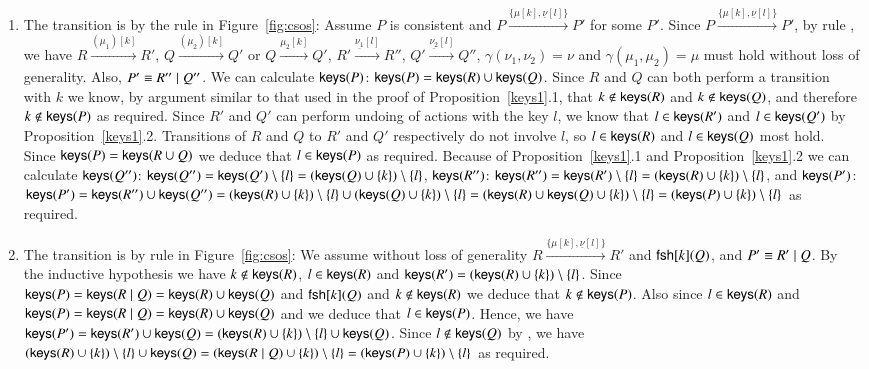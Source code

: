 \begin{subappendices}
\begin{pf}
\begin{enumerate}
\begin{enumerate}
\begin{enumerate}
	\item The transition is by the rule  in Figure~\ref{fig:csos}: Assume $P$ is consistent and $P \xrightarrow{\{\mu[k], \underline{\nu}[l]\}} P'$ for some $P'$. Since $P \xrightarrow{\{\mu[k], \underline{\nu}[l]\}} P'$, by rule , we have $R \xrightarrow{(\mu_1)[k]} R'$, $Q \xrightarrow{(\mu_2)[k]} Q'$ or $Q \xrightarrow{\mu_2[k]} Q'$, $R' \xrightarrow{\underline{\nu_1}[l]} R''$, $Q' \xrightarrow{\underline{\nu_2}[l]} Q''$, $\gamma(\nu_1,\nu_2)=\nu$ and $\gamma(\mu_1,\mu_2)=\mu$ must hold without loss of generality. Also, $P' \equiv R'' \; \vert \; Q''$. We can calculate $\mathsf{keys}(P)$: $\mathsf{keys}(P)=\mathsf{keys}(R) \cup \mathsf{keys}(Q)$. 
Since $R$ and $Q$ can both perform a transition with $k$ we know, by argument similar 
to that used in the proof of Proposition~\ref{keys1}.1,  that $k \notin \mathsf{keys}(R)$ and 
$k \notin \mathsf{keys}(Q)$, and therefore $k \notin \mathsf{keys}(P)$ as required. Since $R'$ and $Q'$ 
can perform undoing of actions with the key $l$, we know that $l \in \mathsf{keys}(R')$ and 
$l \in \mathsf{keys}(Q')$ by Proposition~\ref{keys1}.2. Transitions of $R$ and $Q$ to $R'$ and $Q'$ respectively do not involve $l$, so $l \in \mathsf{keys}(R)$ and $l \in \mathsf{keys}(Q)$ most hold. Since $\mathsf{keys}(P)=\mathsf{keys}(R \cup Q)$ we 
deduce that $l \in \mathsf{keys}(P)$ as required. 
Because of Proposition~\ref{keys1}.1 and Proposition~\ref{keys1}.2 we can calculate 
$\mathsf{keys}(Q'')$: $\mathsf{keys}(Q'')=\mathsf{keys}(Q') \setminus \{l\}=(\mathsf{keys}(Q) \cup \{k\}) \setminus \{l\}$, 
$\mathsf{keys}(R'')$: $\mathsf{keys}(R'')=\mathsf{keys}(R') \setminus \{l\}=(\mathsf{keys}(R) \cup \{k\}) \setminus \{l\}$, 
and $\mathsf{keys}(P')$: $\mathsf{keys}(P')=\mathsf{keys}(R'') \cup \mathsf{keys}(Q'')=
(\mathsf{keys}(R) \cup \{k\}) \setminus \{l\} \cup (\mathsf{keys}(Q) \cup \{k\}) \setminus \{l\}=
(\mathsf{keys}(R) \cup \mathsf{keys}(Q) \cup \{k\}) \setminus \{l\}=(\mathsf{keys}(P) \cup \{k\})\setminus\{l\}$ 
as required.

\item The transition is by  rule in Figure~\ref{fig:csos}: 
We assume without loss of generality $R \xrightarrow{\{\mu[k], \underline{\nu}[l]\}} R'$ 
and $\mathsf{fsh}[k](Q)$, and $P'\equiv R'\; \vert \; Q$. By the inductive hypothesis we have 
$k \notin \mathsf{keys}(R)$, $l \in \mathsf{keys}(R)$ and $\mathsf{keys}(R')=(\mathsf{keys}(R) \cup \{k\})\setminus\{l\}$. 
Since $\mathsf{keys}(P)=\mathsf{keys}(R \; \vert \; Q)=\mathsf{keys}(R) \cup \mathsf{keys}(Q)$ and $\mathsf{fsh}[k](Q)$ and 
$k \notin \mathsf{keys}(R)$ we deduce that $k \notin \mathsf{keys}(P)$. Also since $l \in \mathsf{keys}(R)$ and 
$\mathsf{keys}(P)=\mathsf{keys}(R \; \vert \; Q)=\mathsf{keys}(R) \cup \mathsf{keys}(Q)$ and we deduce that $l \in \mathsf{keys}(P)$.
Hence, we have  
$\mathsf{keys}(P')=\mathsf{keys}(R') \cup \mathsf{keys}(Q)=(\mathsf{keys}(R) \cup \{k\})\setminus\{l\} \cup \mathsf{keys}(Q)$.
Since $l\notin \mathsf{keys}(Q)$ by , we have
		$(\mathsf{keys}(R) \cup \{k\})\setminus\{l\} \cup \mathsf{keys}(Q)=
(\mathsf{keys}(R \; \vert \; Q) \cup \{k\})\setminus\{l\}=(\mathsf{keys}(P) \cup \{k\})\setminus\{l\}$ as required.
\end{enumerate}


\end{enumerate}
\end{enumerate}
\end{pf}
\end{subappendices}
